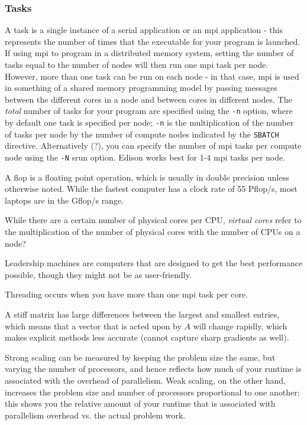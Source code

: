 \documentclass[10pt]{article}
\begin{document}
\begin{flushleft}
\subsubsection{Tasks}
A task is a single instance of a serial application or an \gls{mpi} application - this represents the number of times that the executable for your program is launched. If using \gls{mpi} to program in a distributed memory system, setting the number of tasks equal to the number of nodes will then run one \gls{mpi} task per node. However, more than one task can be run on each node - in that case, \gls{mpi} is used in something of a shared memory programming model by passing messages between the different cores in a node and between cores in different nodes. The \textit{total} number of tasks for your program are specified using the {\tt -n} option, where by default one task is specified per node; {\tt -n} is the multiplication of the number of tasks per node by the number of compute nodes indicated by the {\tt SBATCH} directive. Alternatively (?), you can specify the number of \gls{mpi} tasks per compute node using the {\tt -N} srun option. Edison works best for 1-4 \gls{mpi} tasks per node. 


A flop is a floating point operation, which is usually in double precision unless otherwise noted. While the fastest computer has a clock rate of 55 Pflop/s, most laptops are in the Gflop/s range. 

While there are a certain number of physical cores per CPU, \textit{virtual cores} refer to the multiplication of the number of physical cores with the number of CPUs on a node? 

Leadership machines are computers that are designed to get the best performance possible, though they might not be as user-friendly.

Threading occurs when you have more than one \gls{mpi} task per core. 

A stiff matrix has large differences between the largest and smallest entries, which means that a vector that is acted upon by \(A\) will change rapidly, which makes explicit methods less accurate (cannot capture sharp gradients as well). 

Strong scaling can be measured by keeping the problem size the same, but varying the number of processors, and hence reflects how much of your runtime is associated with the overhead of parallelism. Weak scaling, on the other hand, increases the problem size and number of processors proportional to one another; this shows you the relative amount of your runtime that is associated with parallelism overhead vs. the actual problem work.


\end{flushleft}
\end{document}
